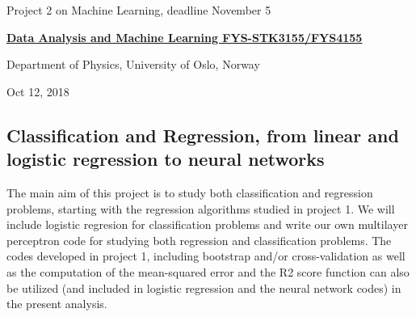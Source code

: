 \documentclass[%
oneside,                 %
final,                   %
10pt]{article}
\begin{document}

\newcommand{\exercisesection}[1]{\subsection*{#1}}






\thispagestyle{empty}

\begin{center}
{\LARGE\bf
\begin{spacing}{1.25}
Project 2 on Machine Learning, deadline November 5
\end{spacing}
}
\end{center}


\begin{center}
{\bf \href{{http://www.uio.no/studier/emner/matnat/fys/FYS3155/index-eng.html}}{Data Analysis and Machine Learning FYS-STK3155/FYS4155}}
\end{center}

    \begin{center}
\centerline{{\small Department of Physics, University of Oslo, Norway}}
\end{center}
    

\begin{center}
Oct 12, 2018
\end{center}

\vspace{1cm}


\subsection{Classification and Regression, from linear and logistic regression to neural networks}

The main aim of this project is to study both classification and
regression problems, starting with the regression algorithms studied
in project 1. We will include logistic regresion for classification
problems and write our own multilayer perceptron code for studying
both regression and classification problems.  The codes developed in
project 1, including bootstrap and/or cross-validation as well as the
computation of the mean-squared error and the R2 score function can
also be utilized (and included in logistic regression and the neural
network codes) in the present analysis.
\end{document}

